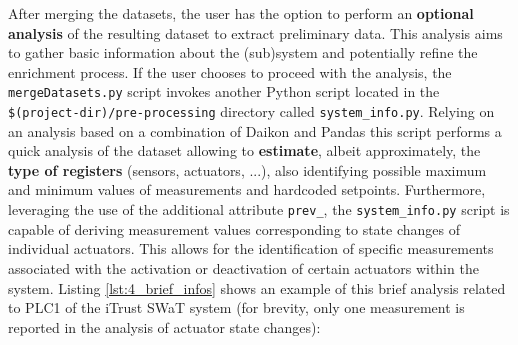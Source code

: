 After merging the datasets, the user has the option to perform an \textbf{optional analysis} of the resulting dataset to extract preliminary data. This analysis aims to gather basic information about the (sub)system and potentially refine the enrichment process. If the user chooses to proceed with the analysis, the \texttt{mergeDatasets.py} script invokes another Python script located in the \texttt{\$(project-dir)/pre-processing} directory called \texttt{system\_info.py}.\newline
Relying on an analysis based on a combination of Daikon and Pandas this script performs a quick analysis of the dataset allowing to \textbf{estimate}, albeit approximately, the \textbf{type of registers} (sensors, actuators, ...), also identifying possible maximum and minimum values of measurements and hardcoded setpoints. Furthermore, leveraging the use of the additional attribute \texttt{prev\_}, the \texttt{system\_info.py} script is capable of deriving measurement values corresponding to state changes of individual actuators. This allows for the identification of specific measurements associated with the activation or deactivation of certain actuators within the system.\newline 
Listing \ref{lst:4_brief_infos} shows an example of this brief analysis related to PLC1 of the iTrust SWaT system (for brevity, only one measurement is reported in the analysis of actuator state changes):


